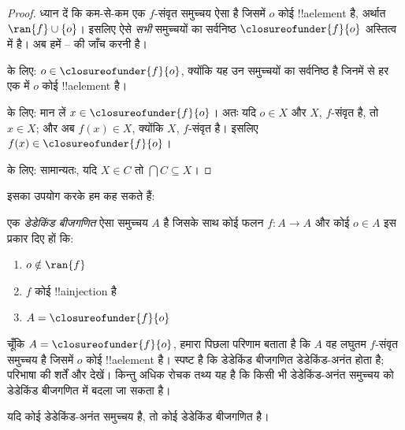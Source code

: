 \documentclass[../../../include/open-logic-section]{subfiles}
\begin{document}
\begin{proof}
ध्यान दें कि कम-से-कम एक $f$-संवृत समुच्चय ऐसा है जिसमें $o$ कोई
!!a{element} है, अर्थात $\ran{f}\cup
\{o\}$। इसलिए ऐसे \emph{सभी} समुच्चयों
का सर्वनिष्ठ $\closureofunder{f}{o}$ अस्तित्व में है। अब हमें
-- की जाँच करनी है।

 के लिए: $o \in \closureofunder{f}{o}$, क्योंकि यह उन
समुच्चयों का सर्वनिष्ठ है जिनमें से हर एक में $o$ कोई !!a{element} है।

 के लिए: मान लें $x \in \closureofunder{f}{o}$। अतः यदि
$o \in X$ और $X$, $f$-संवृत है, तो $x \in X$; और अब $f(x) \in X$, क्योंकि
$X$, $f$-संवृत है। इसलिए $f(x) \in \closureofunder{f}{o}$।

 के लिए: सामान्यतः, यदि $X
\in C$ तो $\bigcap C \subseteq X$।
\end{proof}

इसका उपयोग करके हम कह सकते हैं:

\begin{defn}
एक \emph{डेडेकिंड बीजगणित} ऐसा समुच्चय $A$ है जिसके साथ कोई फलन $f
\colon A \to A$ और कोई $o \in A$ इस प्रकार दिए हों कि:
	\begin{enumerate}
		\item {} $o \notin \ran{f}$
		\item {} $f$ कोई !!a{injection} है
		\item {} $A = \closureofunder{f}{o}$
	\end{enumerate}
\end{defn}

चूँकि $A = \closureofunder{f}{o}$, हमारा पिछला परिणाम बताता है कि $A$ वह
लघुतम $f$-संवृत समुच्चय है जिसमें $o$ कोई !!a{element} है। स्पष्ट है कि
डेडेकिंड बीजगणित डेडेकिंड-अनंत होता है; परिभाषा की शर्तें
 और  देखें। किन्तु अधिक रोचक तथ्य यह है
कि किसी भी डेडेकिंड-अनंत समुच्चय को डेडेकिंड बीजगणित में बदला जा सकता है।

\begin{thm}
यदि कोई डेडेकिंड-अनंत समुच्चय है, तो कोई डेडेकिंड बीजगणित है।
\end{thm}
\end{document}

